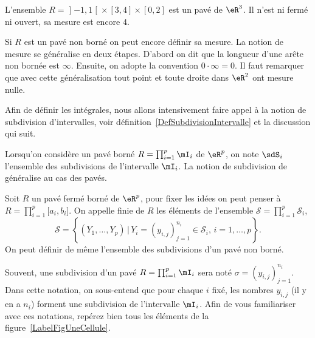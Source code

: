 \begin{example}
	L'ensemble \( R=\mathopen] -1 , 1 \mathclose[\times[3,4]\times[0,2]\) est un pavé de \( \eR^3\). Il n'est ni fermé ni ouvert, sa mesure est encore \( 4\).
\end{example}

Si \( R\) est un pavé non borné on peut encore définir sa mesure. La notion de mesure se généralise en deux étapes. D'abord on dit que la longueur d'une arête non bornée est \( \infty\). Ensuite, on adopte la convention \( 0\cdot \infty=0\). Il faut remarquer que avec cette généralisation tout point et toute droite dans \( \eR^2\) ont mesure nulle.

Afin de définir les intégrales, nous allons intensivement faire appel à la notion de subdivision d'intervalles, voir définition~\ref{DefSubdivisionIntervalle} et la discussion qui suit.

Lorsqu'on considère un pavé borné \( R=\prod_{i=1}^p\mI_i\) de \( \eR^p\), on note \( \sdS_i\) l'ensemble des subdivisions de l'intervalle \( \mI_i\). La notion de subdivision de généralise au cas des pavés.
\begin{definition}
	Soit \( R\) un pavé fermé borné de \( \eR^p\), pour fixer les idées on peut penser à \( R=\prod_{i=1}^p\mathopen[ a_i , b_i \mathclose]\). On appelle  finie de \( R\) les éléments de l'ensemble \( \mathcal{S}=\prod_{i=1}^{p}\mathcal{S}_i\),
	\[
		\mathcal{S}=\left\{ (Y_{1},\ldots, Y_{p})\,\big\vert\, Y_{i}=(y_{i,j})_{j=1}^{n_i}\in\mathcal{S}_i,\, i=1,\ldots,p\right\}.
	\]
	On peut définir de même l'ensemble des subdivisions d'un pavé non borné.
\end{definition}
Souvent, une subdivision d'un pavé \( R=\prod_{i=1}^p\mI_i\) sera noté \( \sigma=(y_{i,j})_{j=1}^{n_i}\). Dans cette notation, on sous-entend que pour chaque \( i\) fixé, les nombres \( y_{i,j}\) (il y en a \( n_i\)) forment une subdivision de l'intervalle \( \mI_i\). Afin de vous familiariser avec ces notations, repérez bien tous les éléments de la figure~\ref{LabelFigUneCellule}.
\newcommand{\CaptionFigUneCellule}{Une cellule d'une subdivision d'un pavé de \( \eR^2\). La cellule grisée est \( R_{(4,2)}\).}




